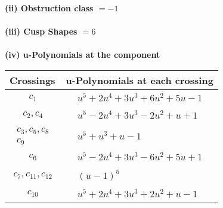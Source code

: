 \documentclass[1p]{elsarticle_modified}
\theoremstyle{definition}
\begin{document}
\flushleft \textbf{(ii) Obstruction class $= -1$}\\~\\
\flushleft \textbf{(iii) Cusp Shapes $= 6$}\\~\\
\newpage\renewcommand{\arraystretch}{1}
\flushleft \textbf{(iv) u-Polynomials at the component}\newline \\
\begin{tabular}{m{50pt}|m{274pt}}
Crossings & \hspace{64pt}u-Polynomials at each crossing \\
\hline $$\begin{aligned}c_{1}\end{aligned}$$&$\begin{aligned}
&u^5+2 u^4+3 u^3+6 u^2+5 u-1
\end{aligned}$\\
\hline $$\begin{aligned}c_{2},c_{4}\end{aligned}$$&$\begin{aligned}
&u^5-2 u^4+3 u^3-2 u^2+u+1
\end{aligned}$\\
\hline $$\begin{aligned}c_{3},c_{5},c_{8}\\c_{9}\end{aligned}$$&$\begin{aligned}
&u^5+u^3+u-1
\end{aligned}$\\
\hline $$\begin{aligned}c_{6}\end{aligned}$$&$\begin{aligned}
&u^5-2 u^4+3 u^3-6 u^2+5 u+1
\end{aligned}$\\
\hline $$\begin{aligned}c_{7},c_{11},c_{12}\end{aligned}$$&$\begin{aligned}
&(u-1)^5
\end{aligned}$\\
\hline $$\begin{aligned}c_{10}\end{aligned}$$&$\begin{aligned}
&u^5+2 u^4+3 u^3+2 u^2+u-1
\end{aligned}$\\
\hline
\end{tabular}\\~\\
\end{document}

